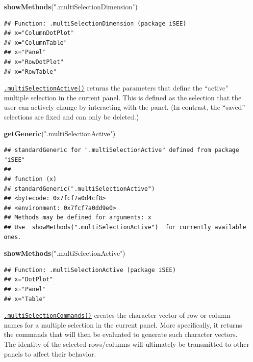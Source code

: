 \documentclass[
]{book}
\newenvironment{Shaded}{\begin{snugshade}}{\end{snugshade}}
\newcommand{\KeywordTok}[1]{\textcolor[rgb]{0.13,0.29,0.53}{\textbf{#1}}}
\newcommand{\NormalTok}[1]{#1}
\newcommand{\StringTok}[1]{\textcolor[rgb]{0.31,0.60,0.02}{#1}}
\begin{document}
\begin{Shaded}
\begin{Highlighting}[]
\KeywordTok{showMethods}\NormalTok{(}\StringTok{".multiSelectionDimension"}\NormalTok{)}
\end{Highlighting}
\end{Shaded}

\begin{verbatim}
## Function: .multiSelectionDimension (package iSEE)
## x="ColumnDotPlot"
## x="ColumnTable"
## x="Panel"
## x="RowDotPlot"
## x="RowTable"
\end{verbatim}

\href{https://isee.github.io/iSEE/reference/multi-select-generics.html}{\texttt{.multiSelectionActive()}} returns the parameters that define the ``active'' multiple selection in the current panel.
This is defined as the selection that the user can actively change by interacting with the panel.
(In contrast, the ``saved'' selections are fixed and can only be deleted.)

\begin{Shaded}
\begin{Highlighting}[]
\KeywordTok{getGeneric}\NormalTok{(}\StringTok{".multiSelectionActive"}\NormalTok{)}
\end{Highlighting}
\end{Shaded}

\begin{verbatim}
## standardGeneric for ".multiSelectionActive" defined from package "iSEE"
## 
## function (x) 
## standardGeneric(".multiSelectionActive")
## <bytecode: 0x7fcf7a0d4cf8>
## <environment: 0x7fcf7a0dd9e0>
## Methods may be defined for arguments: x
## Use  showMethods(".multiSelectionActive")  for currently available ones.
\end{verbatim}

\begin{Shaded}
\begin{Highlighting}[]
\KeywordTok{showMethods}\NormalTok{(}\StringTok{".multiSelectionActive"}\NormalTok{)}
\end{Highlighting}
\end{Shaded}

\begin{verbatim}
## Function: .multiSelectionActive (package iSEE)
## x="DotPlot"
## x="Panel"
## x="Table"
\end{verbatim}

\href{https://isee.github.io/iSEE/reference/multi-select-generics.html}{\texttt{.multiSelectionCommands()}} creates the character vector of row or column names for a multiple selection in the current panel.
More specifically, it returns the commands that will then be evaluated to generate such character vectors.
The identity of the selected rows/columns will ultimately be transmitted to other panels to affect their behavior.
\end{document}
